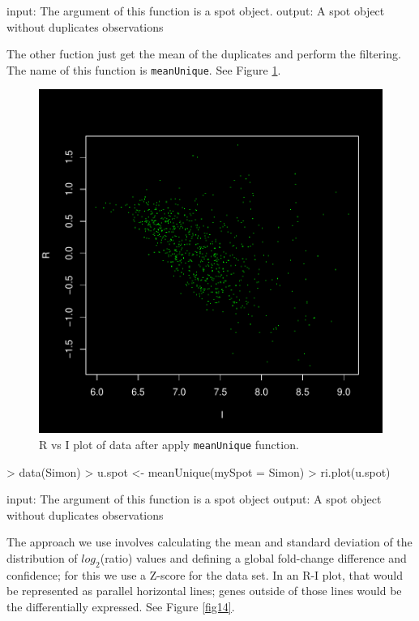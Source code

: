\documentclass[12pt]{article}
\begin{document}
\begin{Soutput}
input: The argument of this function is a spot object.
output: A spot object without duplicates observations
\end{Soutput}

The other fuction just get the mean of the duplicates and perform the filtering. The name of this function is \texttt{meanUnique}. See Figure \ref{fig13}.

\begin{figure}[h]
\begin{center}
\includegraphics{example-genArise-015}
\caption{R vs I plot of data after apply \texttt{meanUnique} function.\label{fig13}}
\end{center}
\end{figure}
\begin{Scode}
> data(Simon)
> u.spot <- meanUnique(mySpot = Simon)
> ri.plot(u.spot)
\end{Scode}

\begin{Soutput}
input: The argument of this function is a spot object
output: A spot object without duplicates observations
\end{Soutput}

The approach we use involves calculating the mean and standard deviation of the distribution of $log_2$(ratio) values and defining a global fold-change difference and confidence; for this we use a Z-score for the data set. In an R-I plot, that would be represented as parallel horizontal lines; genes outside of those lines would be the differentially expressed\footnotemark[2]. See Figure \ref{fig14}.\\
\end{document}
